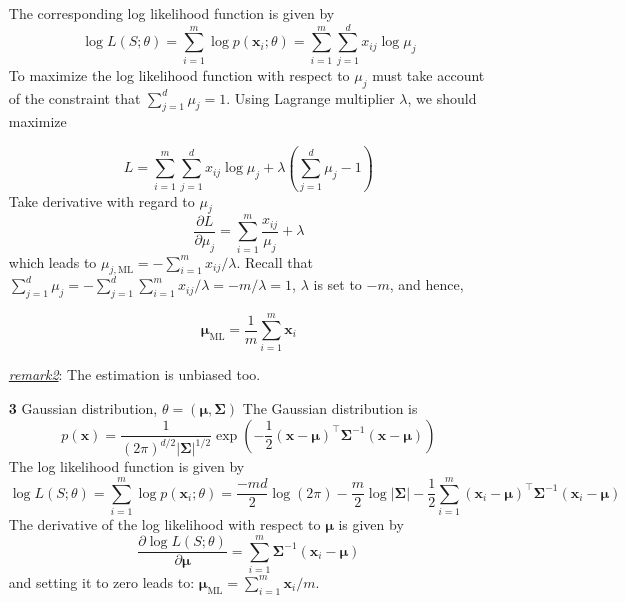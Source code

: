 \documentclass{article}
\begin{document}
\begin{itemize}
	The corresponding log likelihood function is given by
	\begin{equation*}
	\log L(S;\theta) = \sum_{i=1}^m \log p(\bm{x}_i;\theta) = \sum_{i=1}^m \sum_{j=1}^d x_{ij} \log \mu_j
	\end{equation*}
To maximize the log likelihood function with respect to $\mu_j$ must take account of the constraint that $\sum_{j=1}^d \mu_j=1$. Using Lagrange multiplier $\lambda$, we should maximize 
	
	\begin{equation*}
	L = \sum_{i=1}^m \sum_{j=1}^d x_{ij} \log \mu_j + \lambda \left( \sum_{j=1}^d \mu_j - 1 \right)
	\end{equation*}
Take derivative with regard to  $\mu_j$
	\begin{equation*}
	\frac{\partial L}{\partial \mu_j} = \sum_{i=1}^m\frac{x_{ij}}{\mu_j} + \lambda
	\end{equation*}
which leads to $\mu_{j,\mathrm{ML}} = -\sum_{i=1}^m x_{ij}/\lambda$. Recall that $\sum_{j=1}^d \mu_j=-\sum_{j=1}^d \sum_{i=1}^m  x_{ij}/\lambda = -m/\lambda=1$, $\lambda$ is set to $-m$, and hence,

	\begin{equation}
	\bm{\mu}_{\mathrm{ML}} = \frac{1}{m}\sum_{i=1}^m \bm{x}_i
	\end{equation}

	\begin{footnotesize}
	\textit{\underline{remark2}}: The estimation is unbiased too.
	\end{footnotesize}
	
	\item [\textbf{3}] Gaussian distribution, $\theta=(\bm{\mu},\bm{\Sigma})$
	The Gaussian distribution is 
	\begin{equation}
	p(\bm{x}) = \frac{1}{(2\pi)^{d/2} |\bm{\Sigma}|^{1/2}} \exp \left( -\frac{1}{2} (\bm{x} - \bm{\mu})^\top \bm{\Sigma}^{-1} (\bm{x} - \bm{\mu})\right)
	\end{equation}
	The log likelihood function is given by
	\begin{equation*}
	\log L(S;\theta) = \sum_{i=1}^m \log p(\bm{x}_i;\theta) 
	= \frac{-md}{2} \log (2\pi) - \frac{m}{2}\log |\bm{\Sigma}| - \frac{1}{2} \sum_{i=1}^m (\bm{x}_i - \bm{\mu})^\top \bm{\Sigma}^{-1} (\bm{x}_i - \bm{\mu})
	\end{equation*}
	The derivative of the log likelihood with respect to $\bm{\mu}$ is given by
	\begin{equation*}
	\frac{\partial \log L(S;\theta)}{\partial \bm{\mu}} = \sum_{i=1}^m \bm{\Sigma}^{-1} (\bm{x}_i - \bm{\mu})
	\end{equation*}
and setting it to zero leads to: $\bm{\mu}_{\mathrm{ML}}= \sum_{i=1}^m \bm{x}_i / m$.


\end{itemize}
\end{document}
